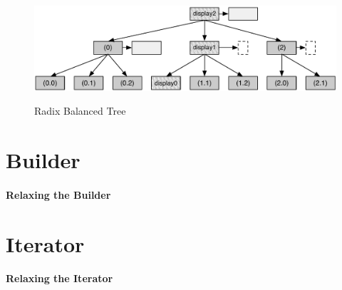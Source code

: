 \begin{figure}[h!]
  \centering
  \includegraphics[width=\textwidth]{Figures/Balanced_subtrees}
  \label{Balanced_subtrees}
  \caption{Radix Balanced Tree}
\end{figure}




\section{Builder}


\paragraph{Relaxing the Builder}




\section{Iterator}

\paragraph{Relaxing the Iterator}







